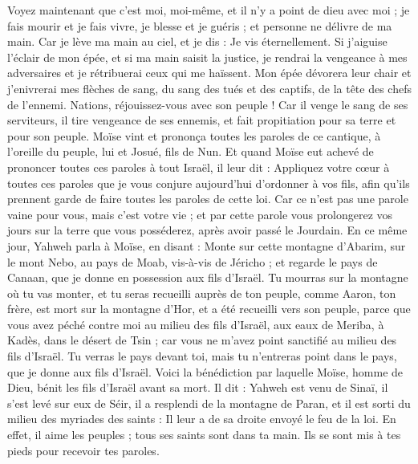 \begin{multicols}{2}
Voyez maintenant que c'est moi, moi-même, et il n'y a point de dieu avec moi ; je fais mourir et je fais vivre, je blesse et je guéris ; et personne ne délivre de ma main.
Car je lève ma main au ciel, et je dis : Je vis éternellement.
Si j'aiguise l'éclair de mon épée, et si ma main saisit la justice, je rendrai la vengeance à mes adversaires et je rétribuerai ceux qui me haïssent.
Mon épée dévorera leur chair et j'enivrerai mes flèches de sang, du sang des tués et des captifs, de la tête des chefs de l'ennemi.
Nations, réjouissez-vous avec son peuple ! Car il venge le sang de ses serviteurs, il tire vengeance de ses ennemis, et fait propitiation pour sa terre et pour son peuple.
Moïse vint et prononça toutes les paroles de ce cantique, à l'oreille du peuple, lui et Josué, fils de Nun.
Et quand Moïse eut achevé de prononcer toutes ces paroles à tout Israël,
il leur dit : Appliquez votre cœur à toutes ces paroles que je vous conjure aujourd'hui d'ordonner à vos fils, afin qu'ils prennent garde de faire toutes les paroles de cette loi.
Car ce n'est pas une parole vaine pour vous, mais c'est votre vie ; et par cette parole vous prolongerez vos jours sur la terre que vous posséderez, après avoir passé le Jourdain.
En ce même jour, Yahweh parla à Moïse, en disant :
Monte sur cette montagne d'Abarim, sur le mont Nebo, au pays de Moab, vis-à-vis de Jéricho ; et regarde le pays de Canaan, que je donne en possession aux fils d'Israël.
Tu mourras sur la montagne où tu vas monter, et tu seras recueilli auprès de ton peuple, comme Aaron, ton frère, est mort sur la montagne d'Hor, et a été recueilli vers son peuple,
parce que vous avez péché contre moi au milieu des fils d'Israël, aux eaux de Meriba, à Kadès, dans le désert de Tsin ; car vous ne m'avez point sanctifié au milieu des fils d'Israël.
Tu verras le pays devant toi, mais tu n'entreras point dans le pays, que je donne aux fils d'Israël.
\VerseOne{}Voici la bénédiction par laquelle Moïse, homme de Dieu, bénit les fils d'Israël avant sa mort.
Il dit : Yahweh est venu de Sinaï, il s'est levé sur eux de Séir, il a resplendi de la montagne de Paran, et il est sorti du milieu des myriades des saints : Il leur a de sa droite envoyé le feu de la loi.
En effet, il aime les peuples ; tous ses saints sont dans ta main. Ils se sont mis à tes pieds pour recevoir tes paroles.

\end{multicols}
